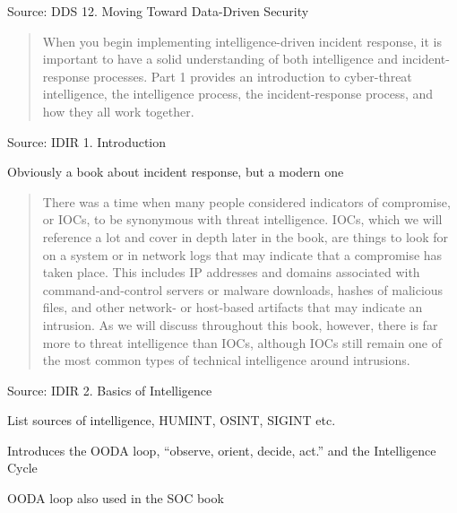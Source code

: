 \documentclass[Screen16to9,17pt]{foils}
\begin{document}
Source: DDS 12. Moving Toward Data-Driven Security







\begin{quote}
When you begin implementing intelligence-driven incident response, it is important to have a solid understanding of both intelligence and incident-response processes. Part 1 provides an introduction to cyber-threat intelligence, the intelligence process, the incident-response process, and how they all work together.
\end{quote}
Source: IDIR 1. Introduction

\begin{list2}
\item Obviously a book about incident response, but a modern one
\end{list2}



\begin{quote}
There was a time when many people considered indicators of compromise, or IOCs, to be synonymous with threat intelligence. IOCs, which we will reference a lot and cover in depth later in the book, are things to look for on a system or in network logs that may indicate that a compromise has taken place. This includes IP addresses and domains associated with command-and-control servers or malware downloads, hashes of malicious files, and other network- or host-based artifacts that may indicate an intrusion. As we will discuss throughout this book, however, there is far more to threat intelligence than IOCs, although IOCs still remain one of the most common types of technical intelligence around intrusions.
\end{quote}
Source:  IDIR 2. Basics of Intelligence

\begin{list2}
\item List sources of intelligence, HUMINT, OSINT, SIGINT etc.
\item Introduces the OODA loop, “observe, orient, decide, act.” and the Intelligence Cycle
\item OODA loop also used in the SOC book
\end{list2}



\end{document}
